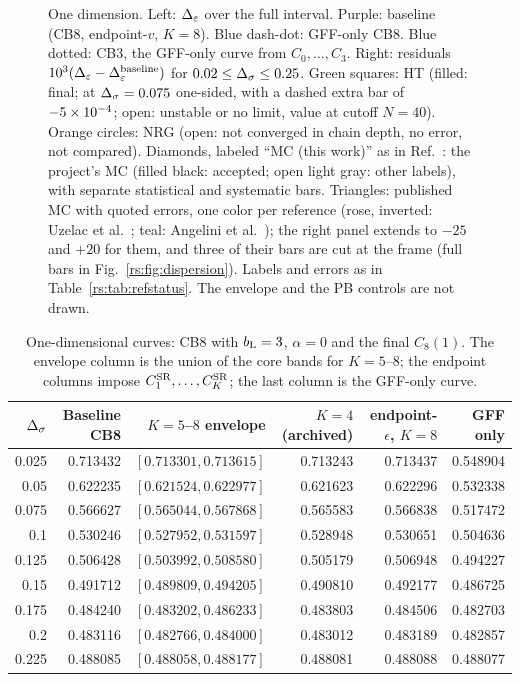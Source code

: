\begin{figure}[htbp]\centering
{}
\caption{One dimension. Left: $\Delta_\varepsilon$ over the full interval. Purple: baseline (CB8,
endpoint-$v$, $K=8$). Blue dash-dot: GFF-only CB8. Blue dotted: CB3, the GFF-only curve from
$C_0,\dots,C_3$. Right: residuals $10^3(\Delta_\varepsilon-\Delta_\varepsilon^{\rm baseline})$ for $0.02\le\Delta_\sigma\le0.25$.
Green squares: HT \cite{rs:noteHT} (filled: final; at $\Delta_\sigma=0.075$ one-sided, with a dashed
extra bar of $-5\times10^{-4}$; open: unstable or no limit, value at cutoff $N=40$). Orange
circles: NRG \cite{rs:noteNRG} (open: not converged in chain depth, no error, not compared).
Diamonds, labeled ``MC (this work)'' as in Ref.~\cite{rs:LRIpaper}: the project's MC
\cite{rs:noteMC} (filled black: accepted; open light gray: other labels), with separate statistical
and systematic bars. Triangles: published MC with quoted errors, one color per reference (rose,
inverted: Uzelac et al.\ \cite{rs:Uzelac:2001lc}; teal: Angelini et al.\ \cite{rs:Angelini:2014koy}); the right panel
extends to $-25$ and $+20$ for them, and three of their bars are cut at the frame (full bars
in Fig.~\ref{rs:fig:dispersion}). Labels and errors as in Table~\ref{rs:tab:refstatus}. The
envelope and the PB controls are not drawn.}
\label{rs:fig:methods}
\end{figure}

\begin{table}[htbp]\centering\small
\begin{tabular}{@{}r r r r r r@{}}
\toprule
$\Delta_\sigma$ & Baseline CB8 & $K=5$--$8$ envelope & $K=4$ (archived) & endpoint-$\epsilon$, $K=8$ & GFF only\\ \midrule
0.025 & 0.713432 & $[0.713301,0.713615]$ & 0.713243 & 0.713437 & 0.548904\\
0.05 & 0.622235 & $[0.621524,0.622977]$ & 0.621623 & 0.622296 & 0.532338\\
0.075 & 0.566627 & $[0.565044,0.567868]$ & 0.565583 & 0.566838 & 0.517472\\
0.1 & 0.530246 & $[0.527952,0.531597]$ & 0.528948 & 0.530651 & 0.504636\\
0.125 & 0.506428 & $[0.503992,0.508580]$ & 0.505179 & 0.506948 & 0.494227\\
0.15 & 0.491712 & $[0.489809,0.494205]$ & 0.490810 & 0.492177 & 0.486725\\
0.175 & 0.484240 & $[0.483202,0.486233]$ & 0.483803 & 0.484506 & 0.482703\\
0.2 & 0.483116 & $[0.482766,0.484000]$ & 0.483012 & 0.483189 & 0.482857\\
0.225 & 0.488085 & $[0.488058,0.488177]$ & 0.488081 & 0.488088 & 0.488077\\
\bottomrule
\end{tabular}
\caption{One-dimensional curves: CB8 with $b_{\mathrm L}=3$, $\alpha=0$ and the final $C_8(1)$. The
envelope column is the union of the core bands for $K=5$--$8$; the endpoint columns impose
$C^{\mathrm{SR}}_1,\dots,C^{\mathrm{SR}}_K$; the last column is the GFF-only curve.}
\label{rs:tab:res1d}
\end{table}


